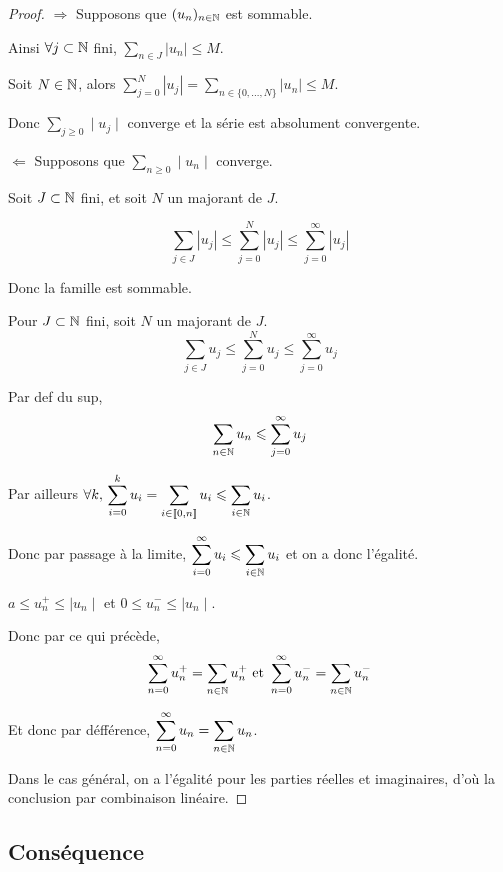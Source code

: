 \begin{proof}
    $\Rightarrow$ Supposons que $(u_n)_{n \in \mathbb{N}}$ est sommable. 

    Ainsi $\forall j \subset \mathbb{N}$ fini, $\displaystyle \sum_{n \in J} |u_n| \leqslant M$.

    Soit $N \in \mathbb{N}$, alors $\displaystyle \sum_{j = 0 }^N |u_j|  = \sum_{n \in \{0, \ldots, N\}} |u_n| \leqslant M$.

    Donc $\sum_{j \geqslant 0} \mid u_j \mid$ converge et la série est absolument convergente. 

    \lvspace $\Leftarrow$ Supposons que $\sum_{n \geqslant 0} \mid u_n \mid $ converge. 

    Soit $J \subset \mathbb{N}$ fini, et soit $N$ un majorant de $J$. 

    $$\sum_{j \in J} |u_j| \leqslant \sum_{j = 0}^N |u_j| \leqslant \sum_{j = 0}^\infty |u_j|$$

    Donc la famille est sommable. 


    Pour $J \subset \mathbb{N}$ fini, soit $N$ un majorant de $J$. 
    $$\sum_{j \in J} u_j \leqslant \sum_{j = 0}^N u_j \leqslant \sum_{j = 0}^\infty u_j$$

    Par def du sup, 
    $$\sum_{n \in \mathbb{N}} u_n \leqslant \sum_{j = 0 }^{\infty } u_j$$

    Par ailleurs $\forall k, \, \displaystyle \sum_{i = 0}^k u_i  = \sum_{i \in [\![0, n]\!]} u_i \leqslant \sum_{i \in \mathbb{N}} u_i$.

    Donc par passage à la limite, $\displaystyle \sum_{i = 0}^\infty u_i \leqslant \sum_{i \in \mathbb{N}} u_i$ et on a donc l'égalité. 


    \svspace $a \leqslant u_n^+ \leqslant \mid u_n \mid$ et $0 \leqslant u_n^- \leqslant \mid u_n \mid$.

    Donc par ce qui précède, 
    $$\sum_{n = 0}^\infty u_n^+ = \sum_{n \in \mathbb{N}} u_n^+ \text{ et } \sum_{n = 0}^\infty u_n^- = \sum_{n \in \mathbb{N}} u_n^-$$

    Et donc par défférence, $\displaystyle \sum_{n = 0}^\infty u_n = \sum_{n \in \mathbb{N}} u_n$.

    Dans le cas général, on a l'égalité pour les parties réelles et imaginaires, d'où la conclusion 
    par combinaison linéaire. 
\end{proof}

\subsection{Conséquence }


